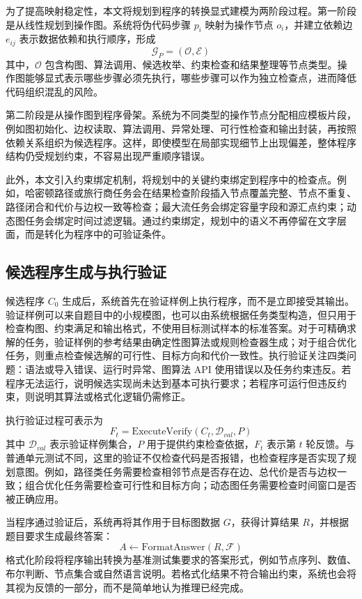 为了提高映射稳定性，本文将规划到程序的转换显式建模为两阶段过程。第一阶段是从线性规划到操作图。系统将伪代码步骤 $p_i$ 映射为操作节点 $o_i$，并建立依赖边 $e_{ij}$ 表示数据依赖和执行顺序，形成
\begin{equation}
\mathcal{G}_P=(\mathcal{O},\mathcal{E})
\end{equation}
其中，$\mathcal{O}$ 包含构图、算法调用、候选枚举、约束检查和结果整理等节点类型。操作图能够显式表示哪些步骤必须先执行，哪些步骤可以作为独立检查点，进而降低代码组织混乱的风险。

第二阶段是从操作图到程序骨架。系统为不同类型的操作节点分配相应模板片段，例如图初始化、边权读取、算法调用、异常处理、可行性检查和输出封装，再按照依赖关系组织为候选程序。这样，即使模型在局部实现细节上出现偏差，整体程序结构仍受规划约束，不容易出现严重顺序错误。

此外，本文引入约束绑定机制，将规划中的关键约束绑定到程序中的检查点。例如，哈密顿路径或旅行商任务会在结果检查阶段插入节点覆盖完整、节点不重复、路径闭合和代价与边权一致等检查；最大流任务会绑定容量字段和源汇点约束；动态图任务会绑定时间过滤逻辑。通过约束绑定，规划中的语义不再停留在文字层面，而是转化为程序中的可验证条件。

\subsection{候选程序生成与执行验证}

候选程序 $C_0$ 生成后，系统首先在验证样例上执行程序，而不是立即接受其输出。验证样例可以来自题目中的小规模图，也可以由系统根据任务类型构造，但只用于检查构图、约束满足和输出格式，不使用目标测试样本的标准答案。对于可精确求解的任务，验证样例的参考结果由确定性图算法或规则检查器生成；对于组合优化任务，则重点检查候选解的可行性、目标方向和代价一致性。执行验证关注四类问题：语法或导入错误、运行时异常、图算法 API 使用错误以及任务约束违反。若程序无法运行，说明候选实现尚未达到基本可执行要求；若程序可运行但违反约束，则说明其算法或格式化逻辑仍需修正。

执行验证过程可表示为
\begin{equation}
F_t=\mathrm{ExecuteVerify}(C_t,\mathcal{D}_{val},P)
\end{equation}
其中 $\mathcal{D}_{val}$ 表示验证样例集合，$P$ 用于提供约束检查依据，$F_t$ 表示第 $t$ 轮反馈。与普通单元测试不同，这里的验证不仅检查代码是否报错，也检查程序是否实现了规划意图。例如，路径类任务需要检查相邻节点是否存在边、总代价是否与边权一致；组合优化任务需要检查可行性和目标方向；动态图任务需要检查时间窗口是否被正确应用。

当程序通过验证后，系统再将其作用于目标图数据 $G$，获得计算结果 $R$，并根据题目要求生成最终答案：
\begin{equation}
A \leftarrow \mathrm{FormatAnswer}(R,\mathcal{F})
\end{equation}
格式化阶段将程序输出转换为基准测试集要求的答案形式，例如节点序列、数值、布尔判断、节点集合或自然语言说明。若格式化结果不符合输出约束，系统也会将其视为反馈的一部分，而不是简单地认为推理已经完成。

